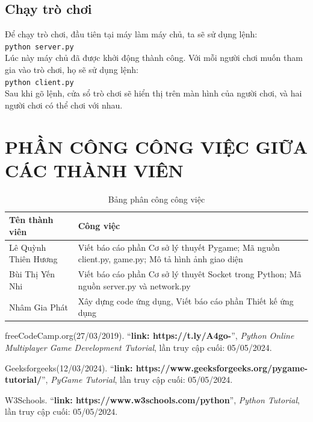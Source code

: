\documentclass[a4paper]{article}
\begin{document}
\subsection{Chạy trò chơi}
Để chạy trò chơi, đầu tiên tại máy làm máy chủ, ta sẽ sử dụng lệnh:\\
{\tt python server.py}\\
Lúc này máy chủ đã được khởi động thành công. Với mỗi người chơi muốn tham gia vào trò chơi, họ sẽ sử dụng lệnh:\\
{\tt python client.py}\\
Sau khi gõ lệnh, cửa sổ trò chơi sẽ hiển thị trên màn hình của người chơi, và hai người chơi có thể chơi với nhau.
\newpage
\section{PHẦN CÔNG CÔNG VIỆC GIỮA CÁC THÀNH VIÊN}

\begin{table}[h]
    \centering
    \begin{tabular}{|p{2cm}|p{8cm}|}
        \hline
        \textbf{Tên thành viên} &\textbf{Công việc} \\
        \hline
         Lê Quỳnh Thiên Hương& Viết báo cáo phần Cơ sở lý thuyết Pygame; Mã nguồn client.py, game.py; Mô tả hình ảnh giao diện \\
         \hline
         Bùi Thị Yến Nhi& Viết báo cáo phần Cơ sở lý thuyêt Socket trong Python; Mã nguồn server.py và network.py \\
         \hline
         Nhâm Gia Phát&Xây dựng code ứng dụng, Viết báo cáo phần Thiết kế ứng dụng\\
         \hline
    \end{tabular}
    \caption{Bảng phân công công việc}
    \label{tab:my_label}
\end{table}

\newpage
\begin{thebibliography}{80}

freeCodeCamp.org(27/03/2019).
``\textbf{link: https://t.ly/A4go-}'',
\textit{Python Online Multiplayer Game Development Tutorial}, lần truy cập cuối: 05/05/2024.

Geeksforgeeks(12/03/2024).
``\textbf{link: https://www.geeksforgeeks.org/pygame-tutorial/}'',
\textit{PyGame Tutorial}, lần truy cập cuối: 05/05/2024.

W3Schools.
``\textbf{link: https://www.w3schools.com/python}'',
\textit{Python Tutorial}, lần truy cập cuối: 05/05/2024.

\end{thebibliography}
\end{document}
